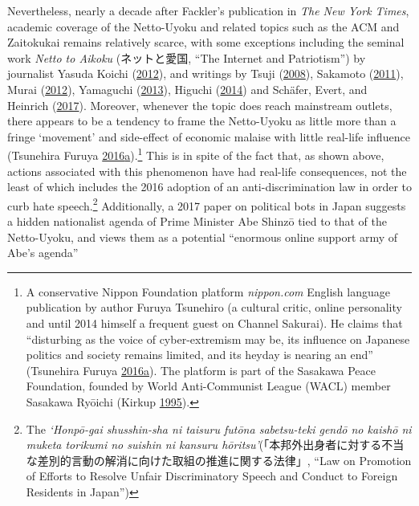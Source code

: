 \documentclass[10pt,british,A4paper,twoside]{memoir}
\begin{document}
Nevertheless, nearly a decade after Fackler's publication in \emph{The
New York Times}, academic coverage of the Netto-Uyoku and related topics
such as the ACM and Zaitokukai remains relatively scarce, with some
exceptions including the seminal work \emph{Netto to Aikoku}
(ネットと愛国, ``The Internet and Patriotism'') by journalist Yasuda
Koichi (\protect\hyperlink{ref-yasuda_eng:_2012}{2012}), and writings by
Tsuji (\protect\hyperlink{ref-tsuji_eng:_2008}{2008}), Sakamoto
(\protect\hyperlink{ref-sakamoto_koreans_2011}{2011}), Murai
(\protect\hyperlink{ref-murai_net_2012}{2012}), Yamaguchi
(\protect\hyperlink{ref-yamaguchi_xenophobia_2013}{2013}), Higuchi
(\protect\hyperlink{ref-higuchi_japans_2014}{2014}) and Schäfer, Evert,
and Heinrich (\protect\hyperlink{ref-schafer_japans_2017}{2017}).
Moreover, whenever the topic does reach mainstream outlets, there
appears to be a tendency to frame the Netto-Uyoku as little more than a
fringe `movement' and side-effect of economic malaise with little
real-life influence (Tsunehira Furuya
\protect\hyperlink{ref-furuya_roots_2016}{2016}\protect\hyperlink{ref-furuya_roots_2016}{a}).\footnote{A
  conservative Nippon Foundation platform \emph{nippon.com} English
  language publication by author Furuya Tsunehiro (a cultural critic,
  online personality and until 2014 himself a frequent guest on Channel
  Sakurai). He claims that ``disturbing as the voice of cyber-extremism
  may be, its influence on Japanese politics and society remains
  limited, and its heyday is nearing an end'' (Tsunehira Furuya
  \protect\hyperlink{ref-furuya_roots_2016}{2016}\protect\hyperlink{ref-furuya_roots_2016}{a}).
  The platform is part of the Sasakawa Peace Foundation, founded by
  World Anti-Communist League (WACL) member Sasakawa Ryōichi (Kirkup
  \protect\hyperlink{ref-kirkup_obituary:_1995}{1995}).} This is in
spite of the fact that, as shown above, actions associated with this
phenomenon have had real-life consequences, not the least of which
includes the 2016 adoption of an anti-discrimination law in order to
curb hate speech.\footnote{The \emph{`Honpō-gai shusshin-sha ni taisuru
  futōna sabetsu-teki gendō no kaishō ni muketa torikumi no suishin ni
  kansuru
  hōritsu'}(「本邦外出身者に対する不当な差別的言動の解消に向けた取組の推進に関する法律」,
  ``Law on Promotion of Efforts to Resolve Unfair Discriminatory Speech
  and Conduct to Foreign Residents in Japan'')} Additionally, a 2017
paper on political bots in Japan suggests a hidden nationalist agenda of
Prime Minister Abe Shinzō tied to that of the Netto-Uyoku, and views
them as a potential ``enormous online support army of Abe's agenda''
\end{document}
